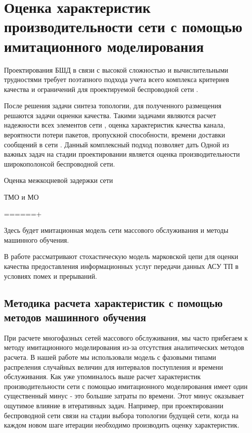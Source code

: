 \chapter{Оценка характеристик производительности сети с помощью имитационного моделирования}\label{prediction_model}

Проектирования БШД в связи с высокой сложностью и вычислительными трудностями требует поэтапного подхода учета всего комплекса критериев качества и ограничений для проектируемой беспроводной сети \cite{Vasiliev2015}.

После решения задачи синтеза топологии, для полученного размещения решаются задачи оцненки качества. Такими задачами являются расчет надежности всех элементов сети \cite{Wankpo2020, Krishnamoorthy2021, Kozyrev2019}, оценка характеристик качества канала, вероятности потери пакетов, пропускной способности, времени доставки сообщений в сети \cite{Gorbunova2020, Larionov2019, Vishnevsky2016_Methods_of_performance, Vishnevsky2016_Review_of_methodology, Wang2017, Sandmann2012, Baumann2017}. Данный комплексный подход позволяет дать
Одной из важных задач на стадии проектировании является оценка производительности широкополонсой беспроводной сети.

Оценка межкоцневой задержки сети \cite{Wang2017, Sandmann2012}

ТМО и МО \cite{Lovas2021, SatyaHermanto201}

======+



Здесь будет имитационная модель сети массового обслуживания и методы машинного обучения.


В работе \cite{Eremenko2013} рассматривают стохастическую модель марковской цепи для оценки качества предоставления информационных услуг передачи данных АСУ ТП в условиях помех и прерываний.

\section{Методика расчета характеристик с помощью методов машинного обучения}


При расчете многофазных сетей массового обслуживания, мы часто прибегаем к методу имитационного моделирования из-за отсутствия аналитических методов расчета. В нашей работе мы использовали модель с фазовыми типами распреления случайных величин для интервалов поступления и времени обслуживания. Как уже упоминалось выше расчет характеристик производительности сети с помощью имитационного моделирования имеет один существенный минус - это большие затраты по времени. Этот минус оказывает ощутимое влияние в итеративных задач. Например, при проектировании беспроводной сети связи на стадии выбора топологии будущей сети, когда на каждом новом шаге итерации необходимо производить оценку характеристик.


